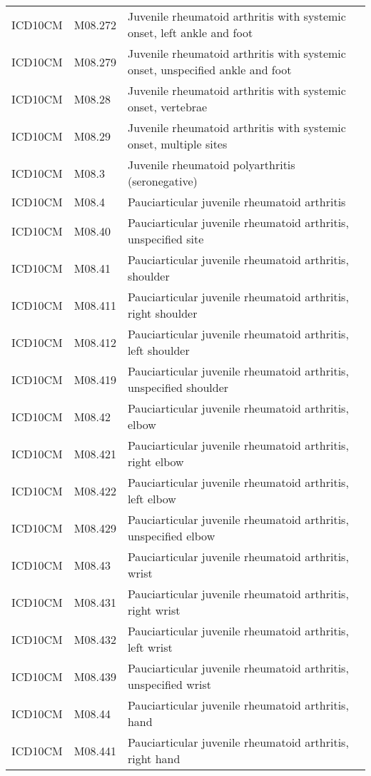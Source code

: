 \begin{table}[ht]
\begin{tabular}{lll}
  ICD10CM & M08.272 & Juvenile rheumatoid arthritis with systemic onset, left ankle and foot \\ 
  ICD10CM & M08.279 & Juvenile rheumatoid arthritis with systemic onset, unspecified ankle and foot \\ 
  ICD10CM & M08.28 & Juvenile rheumatoid arthritis with systemic onset, vertebrae \\ 
  ICD10CM & M08.29 & Juvenile rheumatoid arthritis with systemic onset, multiple sites \\ 
  ICD10CM & M08.3 & Juvenile rheumatoid polyarthritis (seronegative) \\ 
  ICD10CM & M08.4 & Pauciarticular juvenile rheumatoid arthritis \\ 
  ICD10CM & M08.40 & Pauciarticular juvenile rheumatoid arthritis, unspecified site \\ 
  ICD10CM & M08.41 & Pauciarticular juvenile rheumatoid arthritis, shoulder \\ 
  ICD10CM & M08.411 & Pauciarticular juvenile rheumatoid arthritis, right shoulder \\ 
  ICD10CM & M08.412 & Pauciarticular juvenile rheumatoid arthritis, left shoulder \\ 
  ICD10CM & M08.419 & Pauciarticular juvenile rheumatoid arthritis, unspecified shoulder \\ 
  ICD10CM & M08.42 & Pauciarticular juvenile rheumatoid arthritis, elbow \\ 
  ICD10CM & M08.421 & Pauciarticular juvenile rheumatoid arthritis, right elbow \\ 
  ICD10CM & M08.422 & Pauciarticular juvenile rheumatoid arthritis, left elbow \\ 
  ICD10CM & M08.429 & Pauciarticular juvenile rheumatoid arthritis, unspecified elbow \\ 
  ICD10CM & M08.43 & Pauciarticular juvenile rheumatoid arthritis, wrist \\ 
  ICD10CM & M08.431 & Pauciarticular juvenile rheumatoid arthritis, right wrist \\ 
  ICD10CM & M08.432 & Pauciarticular juvenile rheumatoid arthritis, left wrist \\ 
  ICD10CM & M08.439 & Pauciarticular juvenile rheumatoid arthritis, unspecified wrist \\ 
  ICD10CM & M08.44 & Pauciarticular juvenile rheumatoid arthritis, hand \\ 
  ICD10CM & M08.441 & Pauciarticular juvenile rheumatoid arthritis, right hand \\ 

\end{tabular}
\end{table}
